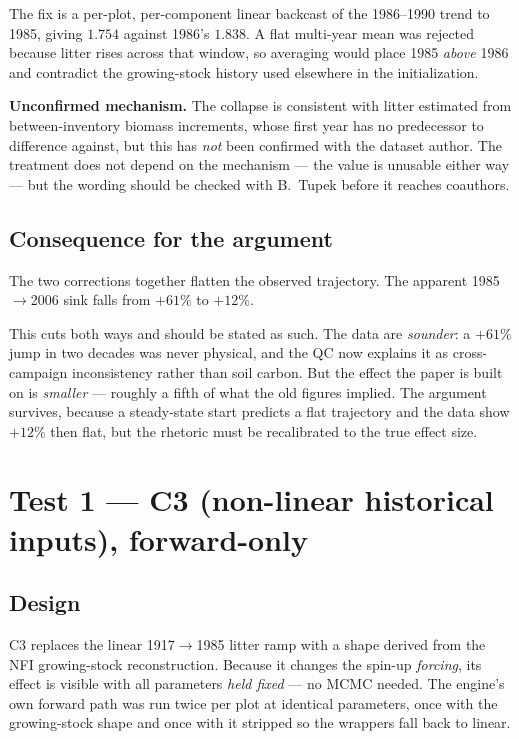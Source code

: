 \documentclass[11pt]{article}
\begin{document}
The fix is a per-plot, per-component linear backcast of the 1986--1990 trend to 1985, giving
$1.754$ against 1986's $1.838$. A flat multi-year mean was rejected because litter rises across
that window, so averaging would place 1985 \emph{above} 1986 and contradict the growing-stock
history used elsewhere in the initialization.

\begin{caveat}
\textbf{Unconfirmed mechanism.} The collapse is consistent with litter estimated from
between-inventory biomass increments, whose first year has no predecessor to difference
against, but this has \emph{not} been confirmed with the dataset author. The treatment does
not depend on the mechanism --- the value is unusable either way --- but the wording should be
checked with B.~Tupek before it reaches coauthors.
\end{caveat}

\subsection{Consequence for the argument}
The two corrections together flatten the observed trajectory. The apparent
1985$\rightarrow$2006 sink falls from $+61\%$ to $+12\%$.

This cuts both ways and should be stated as such. The data are \emph{sounder}: a $+61\%$ jump
in two decades was never physical, and the QC now explains it as cross-campaign inconsistency
rather than soil carbon. But the effect the paper is built on is \emph{smaller} --- roughly a
fifth of what the old figures implied. The argument survives, because a steady-state start
predicts a flat trajectory and the data show $+12\%$ then flat, but the rhetoric must be
recalibrated to the true effect size.

\section{Test 1 --- C3 (non-linear historical inputs), forward-only}

\subsection{Design}
C3 replaces the linear 1917$\rightarrow$1985 litter ramp with a shape derived from the NFI
growing-stock reconstruction. Because it changes the spin-up \emph{forcing}, its effect is
visible with all parameters \emph{held fixed} --- no MCMC needed. The engine's own forward path
was run twice per plot at identical parameters, once with the growing-stock shape and once with
it stripped so the wrappers fall back to linear.
\end{document}
